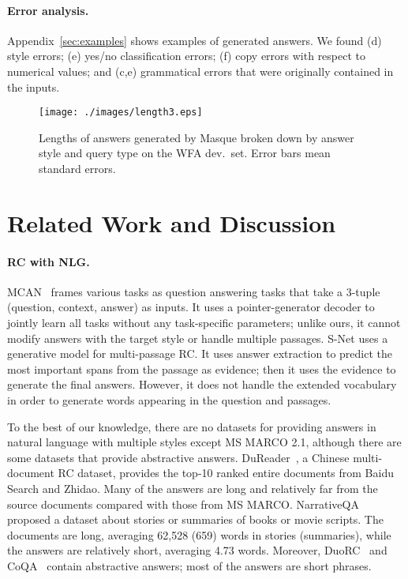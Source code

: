 \documentclass[11pt,a4paper]{article}
\theoremstyle{mydef}
\theoremstyle{myprob}
\begin{document}
\paragraph{Error analysis.}

Appendix~\ref{sec:examples} shows 
examples of generated answers.
We found %
(d) style errors;
(e) yes/no classification errors;
(f) copy errors with respect to numerical values; and
(c,e) grammatical errors that were originally contained in the inputs. %


\begin{figure}[t!]
\centering
\texttt{[image: ./images/length3.eps]}
\caption{Lengths of answers generated by Masque broken down by answer style and query type on the WFA dev.\ set. Error bars mean standard errors.}
\label{fig:length}
\end{figure}

\section{Related Work and Discussion}

\paragraph{RC with NLG.}

MCAN~\citep{McCannKXS18} 
frames various tasks as question answering tasks that take a 3-tuple (question, context, answer) as inputs. It uses a pointer-generator decoder to jointly learn all tasks without any task-specific parameters; unlike ours, it cannot modify answers with the target style or handle multiple passages.
S-Net \citep{TanWYDLZ18} uses a generative model for multi-passage RC. It uses answer extraction to predict the most important spans from the passage as evidence; then it uses the evidence to generate the final answers. However, it 
does not handle the extended vocabulary in order to generate words appearing in the question and passages. 

To the best of our knowledge, there are no datasets for providing answers in natural language with multiple styles except MS MARCO 2.1, although there are some datasets that provide abstractive answers. 
DuReader~\citep{HeLLLZXLWWSLWW18}, a Chinese multi-document RC dataset, provides the top-10 ranked entire documents from Baidu Search and Zhidao. Many of the answers are long and relatively far from the source documents compared with those from MS MARCO.
NarrativeQA~\citep{KociskySBDHMG18} proposed a dataset about stories or summaries of books or movie scripts. The documents are long, averaging 62,528 (659) words in stories (summaries), while the answers are relatively short, averaging 4.73 words. 
Moreover, DuoRC~\citep{KhapraSSA18} and CoQA~\citep{ReddyCM18} contain abstractive answers;  most of the answers are 
short phrases.
\end{document}
